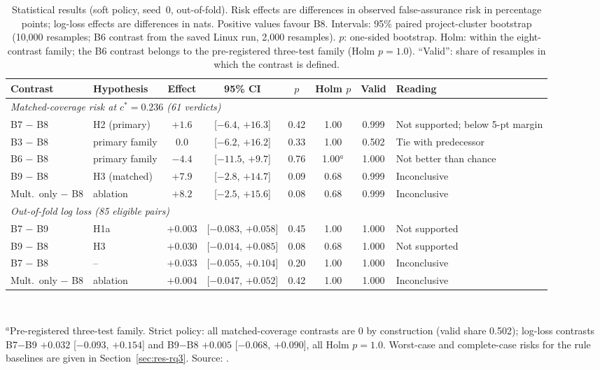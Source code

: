 \begin{table}[!t]
\caption{Statistical results (soft policy, seed~0, out-of-fold). Risk effects are differences in observed false-assurance risk in percentage points; log-loss effects are differences in nats. Positive values favour B8. Intervals: 95\% paired project-cluster bootstrap (10{,}000 resamples; B6 contrast from the saved Linux run, 2{,}000 resamples). $p$: one-sided bootstrap. Holm: within the eight-contrast family; the B6 contrast belongs to the pre-registered three-test family (Holm $p=1.0$). ``Valid'': share of resamples in which the contrast is defined.}
\label{tab:stats}
\centering
\footnotesize
\setlength{\tabcolsep}{4pt}
\begin{tabular}{|l|l|c|c|c|c|c|l|}
\hline
Contrast & Hypothesis & Effect & 95\% CI & $p$ & Holm $p$ & Valid & Reading \\
\hline
\multicolumn{8}{|l|}{\emph{Matched-coverage risk at $c^\ast=0.236$ (61 verdicts)}} \\
B7 $-$ B8 & H2 (primary) & $+1.6$ & [$-6.4$, $+16.3$] & 0.42 & 1.00 & 0.999 & Not supported; below 5-pt margin \\
B3 $-$ B8 & primary family & $0.0$ & [$-6.2$, $+16.2$] & 0.33 & 1.00 & 0.502 & Tie with predecessor \\
B6 $-$ B8 & primary family & $-4.4$ & [$-11.5$, $+9.7$] & 0.76 & 1.00$^{a}$ & 1.000 & Not better than chance \\
B9 $-$ B8 & H3 (matched) & $+7.9$ & [$-2.8$, $+14.7$] & 0.09 & 0.68 & 0.999 & Inconclusive \\
Mult.\ only $-$ B8 & ablation & $+8.2$ & [$-2.5$, $+15.6$] & 0.08 & 0.68 & 0.999 & Inconclusive \\
\hline
\multicolumn{8}{|l|}{\emph{Out-of-fold log loss (85 eligible pairs)}} \\
B7 $-$ B9 & H1a & $+0.003$ & [$-0.083$, $+0.058$] & 0.45 & 1.00 & 1.000 & Not supported \\
B9 $-$ B8 & H3 & $+0.030$ & [$-0.014$, $+0.085$] & 0.08 & 0.68 & 1.000 & Not supported \\
B7 $-$ B8 & -- & $+0.033$ & [$-0.055$, $+0.104$] & 0.20 & 1.00 & 1.000 & Inconclusive \\
Mult.\ only $-$ B8 & ablation & $+0.004$ & [$-0.047$, $+0.052$] & 0.42 & 1.00 & 1.000 & Inconclusive \\
\hline
\end{tabular}
\\[3pt]
\parbox{\textwidth}{\scriptsize $^{a}$Pre-registered three-test family. Strict policy: all matched-coverage contrasts are $0$ by construction (valid share 0.502); log-loss contrasts B7$-$B9 $+0.032$ [$-0.093$, $+0.154$] and B9$-$B8 $+0.005$ [$-0.068$, $+0.090$], all Holm $p=1.0$. Worst-case and complete-case risks for the rule baselines are given in Section~\ref{sec:res-rq3}. Source: .}
\end{table}

